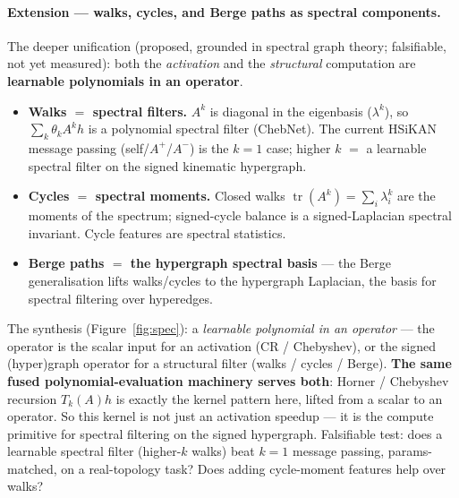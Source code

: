 \documentclass[11pt]{article}
\begin{document}
\paragraph{Extension --- walks, cycles, and Berge paths as spectral components.}
The deeper unification (proposed, grounded in spectral graph theory; falsifiable, not yet measured): both the
\emph{activation} and the \emph{structural} computation are \textbf{learnable polynomials in an operator}.
\begin{itemize}[nosep]
  \item \textbf{Walks $=$ spectral filters.} $A^k$ is diagonal in the eigenbasis ($\lambda^k$), so
        $\sum_k\theta_k A^k h$ is a polynomial spectral filter (ChebNet). The current HSiKAN message passing
        (self/$A^+$/$A^-$) is the $k{=}1$ case; higher $k$ $=$ a learnable spectral filter on the signed
        kinematic hypergraph.
  \item \textbf{Cycles $=$ spectral moments.} Closed walks $\operatorname{tr}(A^k)=\sum_i\lambda_i^k$ are the
        moments of the spectrum; signed-cycle balance is a signed-Laplacian spectral invariant. Cycle features
        are spectral statistics.
  \item \textbf{Berge paths $=$ the hypergraph spectral basis} --- the Berge generalisation lifts walks/cycles
        to the hypergraph Laplacian, the basis for spectral filtering over hyperedges.
\end{itemize}
The synthesis (Figure~\ref{fig:spec}): a \emph{learnable polynomial in an operator} --- the operator is the
scalar input for an activation (CR / Chebyshev), or the signed (hyper)graph operator for a structural filter
(walks / cycles / Berge). \textbf{The same fused polynomial-evaluation machinery serves both}: Horner /
Chebyshev recursion $T_k(A)h$ is exactly the kernel pattern here, lifted from a scalar to an operator. So this
kernel is not just an activation speedup --- it is the compute primitive for spectral filtering on the
signed hypergraph. Falsifiable test: does a learnable spectral filter (higher-$k$ walks) beat $k{=}1$
message passing, params-matched, on a real-topology task? Does adding cycle-moment features help over walks?
\end{document}
